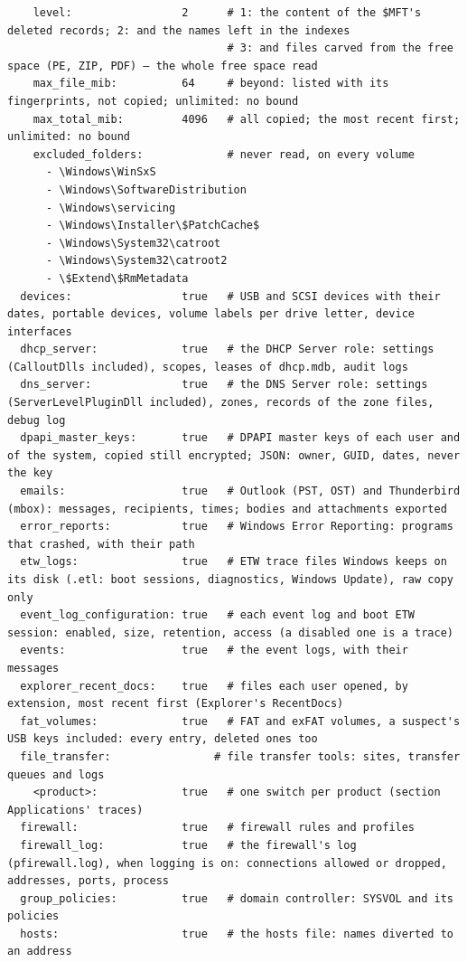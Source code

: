 \documentclass[11pt,a4paper,oneside]{report}
\begin{document}
\begin{lstlisting}
    level:                 2      # 1: the content of the $MFT's deleted records; 2: and the names left in the indexes
                                  # 3: and files carved from the free space (PE, ZIP, PDF) — the whole free space read
    max_file_mib:          64     # beyond: listed with its fingerprints, not copied; unlimited: no bound
    max_total_mib:         4096   # all copied; the most recent first; unlimited: no bound
    excluded_folders:             # never read, on every volume
      - \Windows\WinSxS
      - \Windows\SoftwareDistribution
      - \Windows\servicing
      - \Windows\Installer\$PatchCache$
      - \Windows\System32\catroot
      - \Windows\System32\catroot2
      - \$Extend\$RmMetadata
  devices:                 true   # USB and SCSI devices with their dates, portable devices, volume labels per drive letter, device interfaces
  dhcp_server:             true   # the DHCP Server role: settings (CalloutDlls included), scopes, leases of dhcp.mdb, audit logs
  dns_server:              true   # the DNS Server role: settings (ServerLevelPluginDll included), zones, records of the zone files, debug log
  dpapi_master_keys:       true   # DPAPI master keys of each user and of the system, copied still encrypted; JSON: owner, GUID, dates, never the key
  emails:                  true   # Outlook (PST, OST) and Thunderbird (mbox): messages, recipients, times; bodies and attachments exported
  error_reports:           true   # Windows Error Reporting: programs that crashed, with their path
  etw_logs:                true   # ETW trace files Windows keeps on its disk (.etl: boot sessions, diagnostics, Windows Update), raw copy only
  event_log_configuration: true   # each event log and boot ETW session: enabled, size, retention, access (a disabled one is a trace)
  events:                  true   # the event logs, with their messages
  explorer_recent_docs:    true   # files each user opened, by extension, most recent first (Explorer's RecentDocs)
  fat_volumes:             true   # FAT and exFAT volumes, a suspect's USB keys included: every entry, deleted ones too
  file_transfer:                # file transfer tools: sites, transfer queues and logs
    <product>:             true   # one switch per product (section Applications' traces)
  firewall:                true   # firewall rules and profiles
  firewall_log:            true   # the firewall's log (pfirewall.log), when logging is on: connections allowed or dropped, addresses, ports, process
  group_policies:          true   # domain controller: SYSVOL and its policies
  hosts:                   true   # the hosts file: names diverted to an address

\end{lstlisting}
\end{document}
